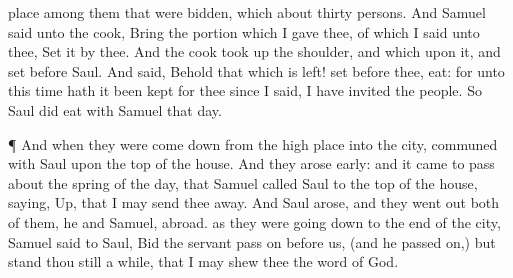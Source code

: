 {place among them that were
bidden, which
{} about
thirty
persons.
And
Samuel
said unto the
cook,
Bring the
portion which I
gave thee, of which I
said unto thee,
Set it by thee.
And the
cook took
up the
shoulder, and
{} which
{} upon it, and
set
{}
before
Saul. And
{}
said, Behold that which is
left!
set
{}
before thee,
{}
eat: for unto this
time hath it been
kept for thee since I
said, I have
invited the
people. So
Saul did
eat with
Samuel that
day.
\par }{\PP {}¶ And when they were come
down from the high
place into the
city,
{}
communed with
Saul upon the top of the
house.
And they arose
early: and it came to pass about the
spring of the
day, that
Samuel
called
Saul to the top of the
house,
saying,
Up, that I may send thee
away. And
Saul
arose, and they went
out
both of them, he and
Samuel,
abroad.
 as they were going
down to the
end of the
city,
Samuel
said to
Saul,
Bid the
servant pass
on
before us, (and he passed
on,) but
stand thou still a
while, that I may
shew thee the
word of
God.

}
